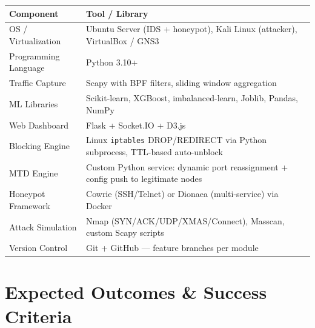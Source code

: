 \documentclass[12pt,a4paper]{article}
\begin{document}
\begin{table}[h!]
\centering
\small
\begin{tabular}{L{4cm} L{10cm}}
  \toprule
  \textbf{Component} & \textbf{Tool / Library} \\
  \midrule
  OS / Virtualization    & Ubuntu Server (IDS + honeypot), Kali Linux (attacker), VirtualBox / GNS3 \\
  Programming Language   & Python 3.10+ \\
  Traffic Capture        & Scapy with BPF filters, sliding window aggregation \\
  ML Libraries           & Scikit-learn, XGBoost, imbalanced-learn, Joblib, Pandas, NumPy \\
  Web Dashboard          & Flask + Socket.IO + D3.js \\
  Blocking Engine        & Linux \texttt{iptables} DROP/REDIRECT via Python subprocess, TTL-based auto-unblock \\
  MTD Engine             & Custom Python service: dynamic port reassignment + config push to legitimate nodes \\
  Honeypot Framework     & Cowrie (SSH/Telnet) or Dionaea (multi-service) via Docker \\
  Attack Simulation      & Nmap (SYN/ACK/UDP/XMAS/Connect), Masscan, custom Scapy scripts \\
  Version Control        & Git + GitHub --- feature branches per module \\
  \bottomrule
\end{tabular}
\end{table}


\section{Expected Outcomes \& Success Criteria}
\end{document}
